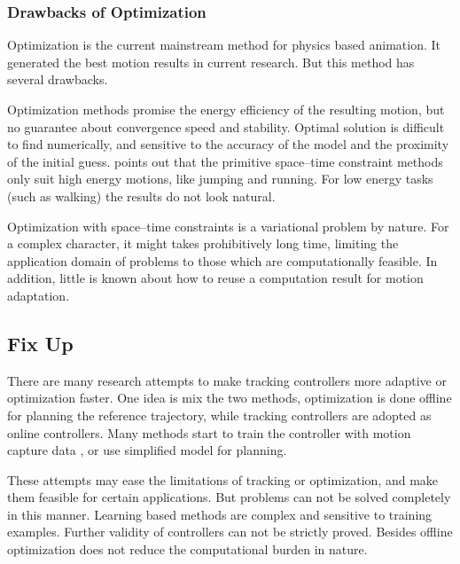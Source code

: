 \subsubsection*{Drawbacks of Optimization}
Optimization is the current mainstream method for physics based animation.
It generated the best motion results in current research.
But this method has several drawbacks.

\begin{itemize}
Optimization methods promise the energy efficiency of the resulting motion, but no guarantee about convergence speed and stability.
Optimal solution is difficult to find numerically, and sensitive to the accuracy of the model and the proximity of the initial guess.
\citet{Liu2005} points out that the primitive space–time constraint methods only suit high energy motions, like jumping and running.
For low energy tasks (such as walking) the results do not look natural.

Optimization with space–time constraints is a variational problem by nature. 
For a complex character, it might takes  prohibitively long time, limiting the application domain of problems to those which are computationally feasible. 
In addition, little is known about how to reuse a computation result for motion adaptation.
\end{itemize}


\subsection{Fix Up}
There are many research attempts to make tracking controllers more adaptive or optimization faster.
One idea is mix the two methods, optimization is done offline for planning the reference trajectory, while tracking controllers are adopted as online controllers.
Many methods start to train the controller with motion capture data \citep{levine2011space,coros2010generalized,de2010feature,wei2011physically,ye2010optimal,lee2010motion,wang2010optimizing,wu2010terrain,liu2010sampling,lee2010data}, or use simplified model for planning\citep{mordatch2010robust}.


These attempts may ease the limitations of tracking or optimization, and make them feasible for certain applications.
But \cms problems can not be solved completely in this manner.
Learning based methods are complex and  sensitive to training examples.
Further validity of controllers can not be strictly proved.
Besides  offline optimization  does not reduce the computational burden in nature.




